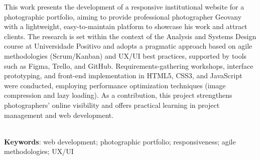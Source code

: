 \begin{thesisabastract}
This work presents the development of a responsive institutional website for a photographic portfolio, aiming to provide professional photographer Geovany with a lightweight, easy-to-maintain platform to showcase his work and attract clients. The research is set within the context of the Analysis and Systems Design course at Universidade Positivo and adopts a pragmatic approach based on agile methodologies (Scrum/Kanban) and UX/UI best practices, supported by tools such as Figma, Trello, and GitHub. Requirements-gathering workshops, interface prototyping, and front-end implementation in HTML5, CSS3, and JavaScript were conducted, employing performance optimization techniques (image compression and lazy loading). As a contribution, this project strengthens photographers’ online visibility and offers practical learning in project management and web development.

\ \\


\textbf{Keywords}: web development; photographic portfolio; responsiveness; agile methodologies; UX/UI
\end{thesisabastract}

